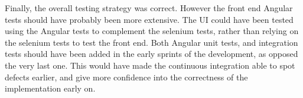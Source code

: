 Finally, the overall testing strategy was correct. However the front end Angular
tests should have probably been more extensive. The UI could have been tested
using the Angular tests to complement the selenium tests, rather than relying
on the selenium tests to test the front end. Both Angular unit tests, and integration
tests should have been added in the early sprints of the development, as opposed
the very last one. This would have made the continuous integration able to
spot defects earlier, and give more confidence into the correctness of the implementation
early on.


%
%
%
%
%
%
